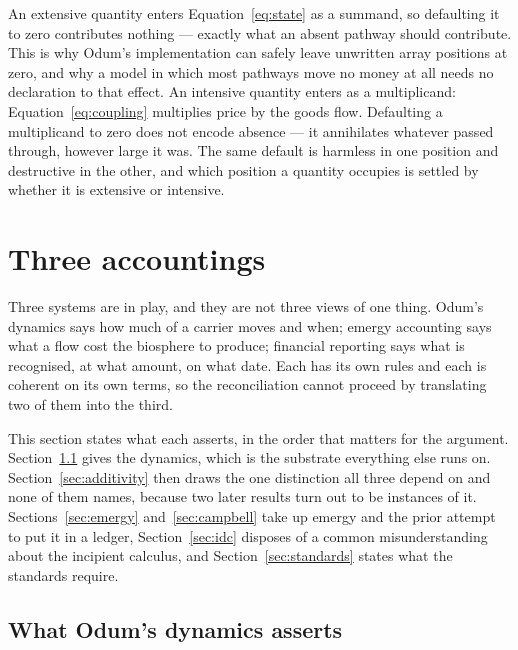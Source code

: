 \documentclass[11pt,a4paper]{article}
\begin{document}
An extensive quantity enters Equation~\eqref{eq:state} as a summand, so defaulting it to zero contributes nothing --- exactly what an absent pathway should contribute. This is why Odum's implementation can safely leave unwritten array positions at zero, and why a model in which most pathways move no money at all needs no declaration to that effect. An intensive quantity enters as a multiplicand: Equation~\eqref{eq:coupling} multiplies price by the goods flow. Defaulting a multiplicand to zero does not encode absence --- it annihilates whatever passed through, however large it was. The same default is harmless in one position and destructive in the other, and which position a quantity occupies is settled by whether it is extensive or intensive.

\section{Three accountings}
\label{sec:accountings}

Three systems are in play, and they are not three views of one thing. Odum's dynamics says how much of a carrier moves and when; emergy accounting says what a flow cost the biosphere to produce; financial reporting says what is recognised, at what amount, on what date. Each has its own rules and each is coherent on its own terms, so the reconciliation cannot proceed by translating two of them into the third.

This section states what each asserts, in the order that matters for the argument. Section~\ref{sec:dynamics} gives the dynamics, which is the substrate everything else runs on. Section~\ref{sec:additivity} then draws the one distinction all three depend on and none of them names, because two later results turn out to be instances of it. Sections~\ref{sec:emergy} and~\ref{sec:campbell} take up emergy and the prior attempt to put it in a ledger, Section~\ref{sec:idc} disposes of a common misunderstanding about the incipient calculus, and Section~\ref{sec:standards} states what the standards require.

\subsection{What Odum's dynamics asserts}
\label{sec:dynamics}
\end{document}
